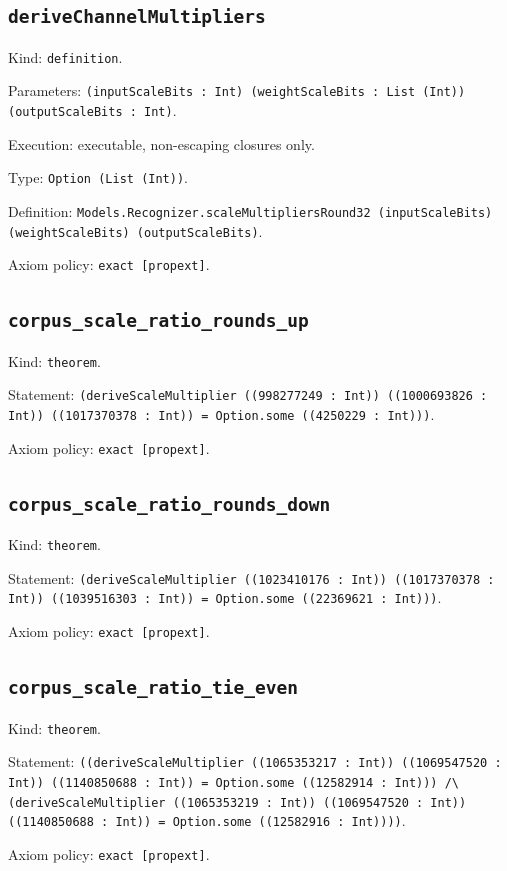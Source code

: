 \documentclass[11pt]{article}
\begin{document}
\subsection*{\texttt{deriveChannelMultipliers}}
\noindent Kind: \texttt{definition}.\par
\noindent Parameters: \texttt{(inputScaleBits : Int) (weightScaleBits : List (Int)) (outputScaleBits : Int)}.\par
\noindent Execution: executable, non-escaping closures only.\par
\noindent Type: \texttt{Option (List (Int))}.\par
\noindent Definition: \texttt{Models.Recognizer.scaleMultipliersRound32 (inputScaleBits) (weightScaleBits) (outputScaleBits)}.\par
\noindent Axiom policy: \texttt{exact [propext]}.\par
\subsection*{\texttt{corpus\_scale\_ratio\_rounds\_up}}
\noindent Kind: \texttt{theorem}.\par
\noindent Statement: \texttt{(deriveScaleMultiplier ((998277249 : Int)) ((1000693826 : Int)) ((1017370378 : Int)) = Option.some ((4250229 : Int)))}.\par
\noindent Axiom policy: \texttt{exact [propext]}.\par
\subsection*{\texttt{corpus\_scale\_ratio\_rounds\_down}}
\noindent Kind: \texttt{theorem}.\par
\noindent Statement: \texttt{(deriveScaleMultiplier ((1023410176 : Int)) ((1017370378 : Int)) ((1039516303 : Int)) = Option.some ((22369621 : Int)))}.\par
\noindent Axiom policy: \texttt{exact [propext]}.\par
\subsection*{\texttt{corpus\_scale\_ratio\_tie\_even}}
\noindent Kind: \texttt{theorem}.\par
\noindent Statement: \texttt{((deriveScaleMultiplier ((1065353217 : Int)) ((1069547520 : Int)) ((1140850688 : Int)) = Option.some ((12582914 : Int))) /\textbackslash{} (deriveScaleMultiplier ((1065353219 : Int)) ((1069547520 : Int)) ((1140850688 : Int)) = Option.some ((12582916 : Int))))}.\par
\noindent Axiom policy: \texttt{exact [propext]}.\par
\end{document}
